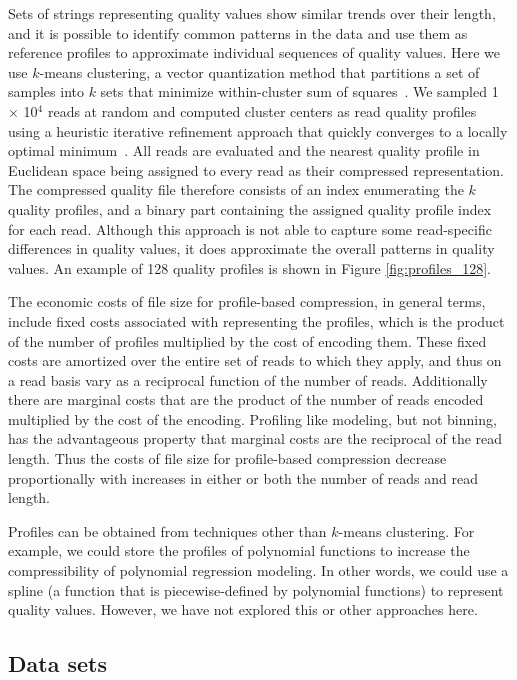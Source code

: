\documentclass{bmcart}
\begin{document}
Sets of strings representing quality values show similar trends over
their length, and it is possible to identify common patterns in the
data and use them as reference profiles to approximate individual
sequences of quality values. Here we use $k$-means clustering, a
vector quantization method that partitions a set of samples into $k$
sets that minimize within-cluster sum of
squares~\cite{macqueen1967some}. We sampled 1 $\times$ 10$^{4}$ reads
at random and computed cluster centers as read quality profiles using
a heuristic iterative refinement approach that quickly converges to a
locally optimal minimum~\cite{hartigan1979algorithm}. All reads are
evaluated and the nearest quality profile in Euclidean space being
assigned to every read as their compressed representation.  The
compressed quality file therefore consists of an index enumerating the
$k$ quality profiles, and a binary part containing the assigned
quality profile index for each read.  Although this approach is not
able to capture some read-specific differences in quality values, it
does approximate the overall patterns in quality values. An example of
128 quality profiles is shown in Figure \ref{fig:profiles_128}.

The economic costs of file size for profile-based compression, in
general terms, include fixed costs associated with representing the
profiles, which is the product of the number of profiles multiplied by
the cost of encoding them. These fixed costs are amortized over the
entire set of reads to which they apply, and thus on a read basis vary
as a reciprocal function of the number of reads. Additionally there
are marginal costs that are the product of the number of reads encoded
multiplied by the cost of the encoding. Profiling like modeling, but
not binning, has the advantageous property that marginal costs are the
reciprocal of the read length. Thus the costs of file size for
profile-based compression decrease proportionally with increases in
either or both the number of reads and read length.

Profiles can be obtained from techniques other than $k$-means
clustering. For example, we could store the profiles of polynomial
functions to increase the compressibility of polynomial regression
modeling. In other words, we could use a spline (a function that is
piecewise-defined by polynomial functions) to represent quality
values. However, we have not explored this or other approaches here.

\subsection*{Data sets}
\end{document}
